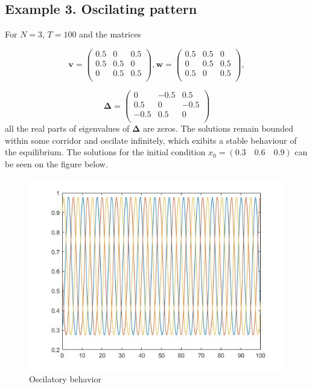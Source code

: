 \documentclass[a4paper,10pt, english]{article}
\begin{document}
\newpage
\newpage
\newpage
\subsection{Example 3. Oscilating pattern}
For $N=3$, $T=100$ and the matrices

\[\mathbf{v} =  \left( \begin{array}{ccc}
 0.5 & 0   & 0.5 \\
 0.5 & 0.5 & 0   \\
 0   & 0.5 & 0.5 \\
\end{array} \right),
%
\mathbf{w} = 
\left( \begin{array}{ccc}
0.5 & 0.5 & 0\\ 
0  & 0.5 & 0.5\\
0.5 & 0 & 0.5\\
\end{array} \right),
\]

$$
\mathbf{\Delta} = 
\left(
\begin{matrix}
0   & -0.5 & 0.5 \\
0.5 &  0 & -0.5 \\
-0.5 &  0.5 & 0 \\
\end{matrix}
\right)
$$
all the real parts of eigenvalues of $\mathbf{\Delta}$ are zeros. 
The solutions remain bounded within some corridor and oscilate infinitely, which exibits a stable behaviour of the equilibrium. The solutions for the initial condition $x_0 = (0.3\quad 0.6\quad 0.9)$ can be seen on the figure below. 

\begin{figure}[ht]
\label{fig_osc}
\centering
\includegraphics[scale= 0.4]{osc.jpg}
\caption{Oscilatory behavior}
\end{figure}
\end{document}

